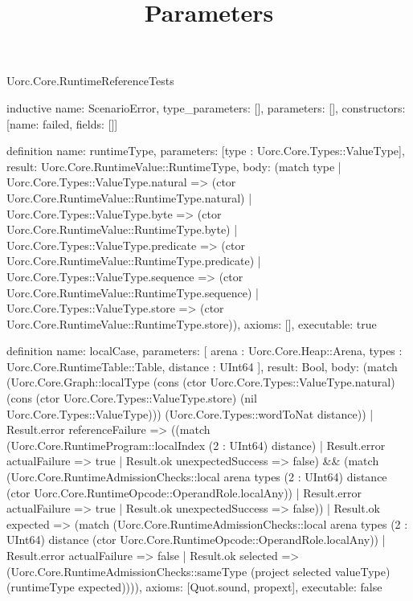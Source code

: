 \begin{lexlean}{Uorc.Core.RuntimeReferenceTests}
\title{Parameters}
\begin{semanticmodule}
inductive{
  name: ScenarioError,
  type_parameters: [],
  parameters: [],
  constructors: [{name: failed, fields: []}]
}

definition{
  name: runtimeType,
  parameters: [type : Uorc.Core.Types::ValueType],
  result: Uorc.Core.RuntimeValue::RuntimeType,
  body: (match type
    | Uorc.Core.Types::ValueType.natural => (ctor Uorc.Core.RuntimeValue::RuntimeType.natural)
    | Uorc.Core.Types::ValueType.byte => (ctor Uorc.Core.RuntimeValue::RuntimeType.byte)
    | Uorc.Core.Types::ValueType.predicate => (ctor Uorc.Core.RuntimeValue::RuntimeType.predicate)
    | Uorc.Core.Types::ValueType.sequence => (ctor Uorc.Core.RuntimeValue::RuntimeType.sequence)
    | Uorc.Core.Types::ValueType.store => (ctor Uorc.Core.RuntimeValue::RuntimeType.store)),
  axioms: [],
  executable: true
}

definition{
  name: localCase,
  parameters: [
    arena : Uorc.Core.Heap::Arena,
    types : Uorc.Core.RuntimeTable::Table,
    distance : UInt64
  ],
  result: Bool,
  body: (match (Uorc.Core.Graph::localType (cons (ctor Uorc.Core.Types::ValueType.natural) (cons (ctor Uorc.Core.Types::ValueType.store) (nil Uorc.Core.Types::ValueType))) (Uorc.Core.Types::wordToNat distance))
    | Result.error referenceFailure => ((match (Uorc.Core.RuntimeProgram::localIndex (2 : UInt64) distance)
      | Result.error actualFailure => true
      | Result.ok unexpectedSuccess => false) && (match (Uorc.Core.RuntimeAdmissionChecks::local arena types (2 : UInt64) distance (ctor Uorc.Core.RuntimeOpcode::OperandRole.localAny))
      | Result.error actualFailure => true
      | Result.ok unexpectedSuccess => false))
    | Result.ok expected => (match (Uorc.Core.RuntimeAdmissionChecks::local arena types (2 : UInt64) distance (ctor Uorc.Core.RuntimeOpcode::OperandRole.localAny))
      | Result.error actualFailure => false
      | Result.ok selected => (Uorc.Core.RuntimeAdmissionChecks::sameType (project selected valueType) (runtimeType expected)))),
  axioms: [Quot.sound, propext],
  executable: false
}


\end{semanticmodule}
\end{lexlean}
